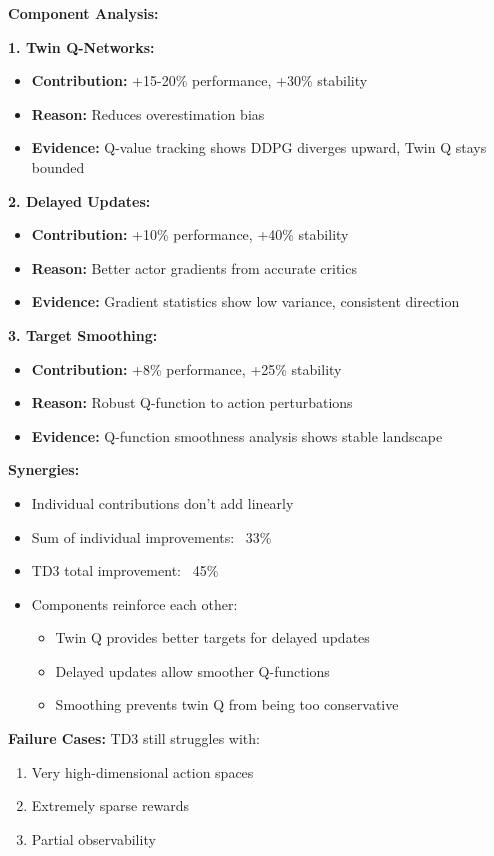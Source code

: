 \documentclass[12pt]{article}
\begin{document}
{{\textbf{Component Analysis:}

\textbf{1. Twin Q-Networks:}
\begin{itemize}
\item \textbf{Contribution:} +15-20\% performance, +30\% stability
\item \textbf{Reason:} Reduces overestimation bias
\item \textbf{Evidence:} Q-value tracking shows DDPG diverges upward, Twin Q stays bounded
\end{itemize}

\textbf{2. Delayed Updates:}
\begin{itemize}
\item \textbf{Contribution:} +10\% performance, +40\% stability
\item \textbf{Reason:} Better actor gradients from accurate critics
\item \textbf{Evidence:} Gradient statistics show low variance, consistent direction
\end{itemize}

\textbf{3. Target Smoothing:}
\begin{itemize}
\item \textbf{Contribution:} +8\% performance, +25\% stability
\item \textbf{Reason:} Robust Q-function to action perturbations
\item \textbf{Evidence:} Q-function smoothness analysis shows stable landscape
\end{itemize}

\textbf{Synergies:}
\begin{itemize}
\item Individual contributions don't add linearly
\item Sum of individual improvements: ~33\%
\item TD3 total improvement: ~45\%
\item Components reinforce each other:
  \begin{itemize}
  \item Twin Q provides better targets for delayed updates
  \item Delayed updates allow smoother Q-functions
  \item Smoothing prevents twin Q from being too conservative
  \end{itemize}
\end{itemize}

\textbf{Failure Cases:}
TD3 still struggles with:
\begin{enumerate}
\item Very high-dimensional action spaces
\item Extremely sparse rewards
\item Partial observability
\end{enumerate}

}}
\end{document}
